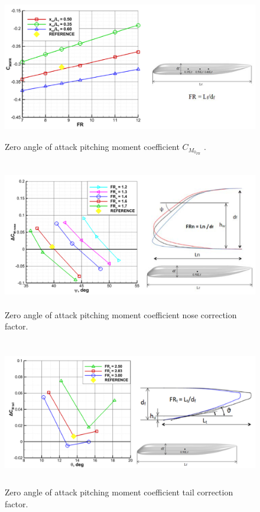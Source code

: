 \begin{figure}[H]
\centering
\includegraphics[height=6.4cm]{Immagini/fuselage1}
\caption{Zero angle of attack pitching moment coefficient $C_{M_{0_{FR}}}$ .}
\label{fusgeometry}
\end{figure}
\begin{figure}[H]
\centering
\includegraphics[height=6.4cm]{Immagini/fuselage2}
\caption{Zero angle of attack pitching moment coefficient nose correction factor.}
\label{fusgeometry}
\end{figure}
\begin{figure}[H]
\centering
\includegraphics[height=6.4cm]{Immagini/fuselage3}
\caption{Zero angle of attack pitching moment coefficient tail correction factor.}
\label{fusgeometry}
\end{figure}
